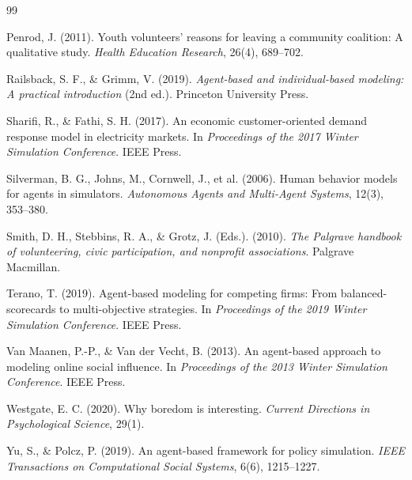 \documentclass[12pt,a4paper]{article}
\begin{document}
\begin{thebibliography}{99}
\item Penrod, J. (2011). Youth volunteers' reasons for leaving a community coalition: A qualitative study. \textit{Health Education Research}, 26(4), 689--702.

\item Railsback, S. F., \& Grimm, V. (2019). \textit{Agent-based and individual-based modeling: A practical introduction} (2nd ed.). Princeton University Press.

\item Sharifi, R., \& Fathi, S. H. (2017). An economic customer-oriented demand response model in electricity markets. In \textit{Proceedings of the 2017 Winter Simulation Conference}. IEEE Press.

\item Silverman, B. G., Johns, M., Cornwell, J., et al. (2006). Human behavior models for agents in simulators. \textit{Autonomous Agents and Multi-Agent Systems}, 12(3), 353--380.

\item Smith, D. H., Stebbins, R. A., \& Grotz, J. (Eds.). (2010). \textit{The Palgrave handbook of volunteering, civic participation, and nonprofit associations}. Palgrave Macmillan.

\item Terano, T. (2019). Agent-based modeling for competing firms: From balanced-scorecards to multi-objective strategies. In \textit{Proceedings of the 2019 Winter Simulation Conference}. IEEE Press.

\item Van Maanen, P.-P., \& Van der Vecht, B. (2013). An agent-based approach to modeling online social influence. In \textit{Proceedings of the 2013 Winter Simulation Conference}. IEEE Press.

\item Westgate, E. C. (2020). Why boredom is interesting. \textit{Current Directions in Psychological Science}, 29(1).

\item Yu, S., \& Polcz, P. (2019). An agent-based framework for policy simulation. \textit{IEEE Transactions on Computational Social Systems}, 6(6), 1215--1227.

\end{thebibliography}
\end{document}
